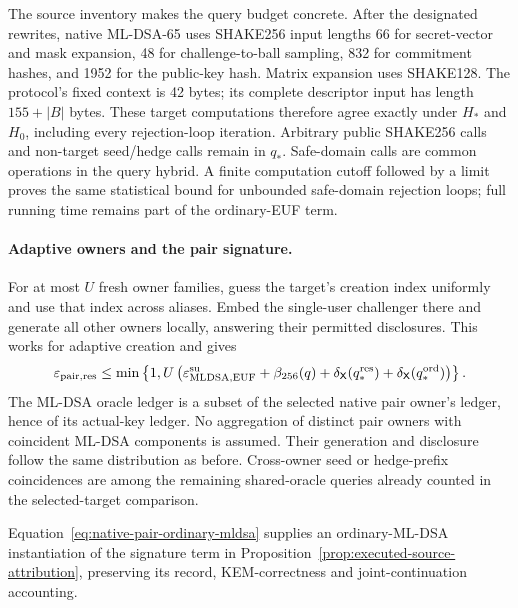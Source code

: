 The source inventory makes the query budget concrete. After the designated
rewrites, native ML-DSA-65 uses SHAKE256 input lengths 66 for secret-vector
and mask expansion, 48 for challenge-to-ball sampling, 832 for commitment
hashes, and 1952 for the public-key hash. Matrix expansion uses SHAKE128.
The protocol's fixed context is 42 bytes; its complete descriptor input
has length $155+|B|$ bytes. These target computations therefore agree
exactly under $H_*$ and $H_0$, including every rejection-loop iteration.
Arbitrary public SHAKE256 calls and non-target seed/hedge calls remain in
$q_*$. Safe-domain calls are common operations in the query hybrid. A
finite computation cutoff followed by a limit proves the same statistical
bound for unbounded safe-domain rejection loops; full running time remains
part of the ordinary-EUF term.

\paragraph{Adaptive owners and the pair signature.}
For at most $U$ fresh owner families, guess the target's creation index
uniformly and use that index across aliases. Embed the single-user
challenger there and generate all other owners locally, answering their
permitted disclosures. This works for adaptive creation and gives
\begin{equation}
 \varepsilon_{\rm pair,res}
 \le\min\left\{1,U\left(
       \varepsilon_{\rm MLDSA,EUF}^{\rm su}
       +\beta_{256}(q)
       +\delta_{\mathsf X}(q_*^{\rm res})
       +\delta_{\mathsf X}(q_*^{\rm ord})\right)\right\}.
 \label{eq:native-pair-ordinary-mldsa}
\end{equation}
The ML-DSA oracle ledger is a subset of the selected native pair owner's
ledger, hence of its actual-key ledger. No aggregation of distinct pair
owners with coincident ML-DSA components is assumed. Their generation
and disclosure follow the same distribution as before. Cross-owner seed or
hedge-prefix coincidences are among the remaining shared-oracle queries
already counted in the selected-target comparison.

Equation~\eqref{eq:native-pair-ordinary-mldsa} supplies an ordinary-ML-DSA
instantiation of the signature term in
Proposition~\ref{prop:executed-source-attribution}, preserving its record,
KEM-correctness and joint-continuation accounting.
